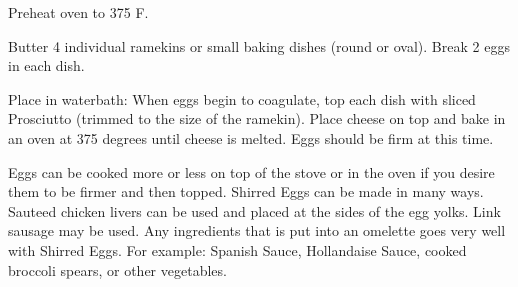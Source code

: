 Preheat oven to 375 \degree F.

Butter 4 individual ramekins or small baking dishes (round or oval). 
Break 2 eggs in each dish.

Place in waterbath: When eggs begin to coagulate, top each dish with sliced 
Prosciutto (trimmed to the size of the ramekin). 
Place cheese on top and bake in an oven at 375 degrees until cheese is melted. 
Eggs should be firm at this time.

Eggs can be cooked more or less on top of the stove or in the oven if you desire them to be firmer and then topped. 
Shirred Eggs can be made in many ways. Sauteed chicken livers can be used and placed at the sides of the egg yolks. 
Link sausage may be used. Any ingredients that is put into an omelette goes very well with Shirred Eggs. 
For example: Spanish Sauce, Hollandaise Sauce, cooked broccoli spears, or other vegetables.